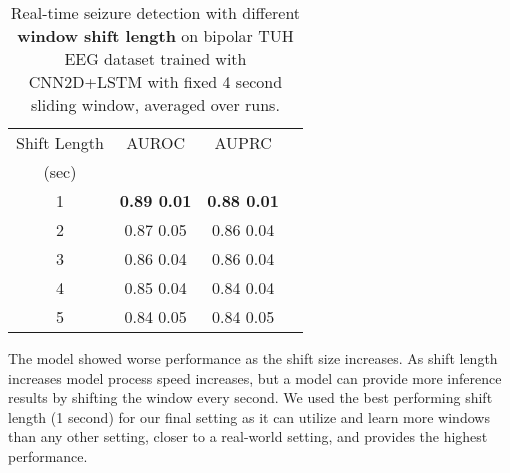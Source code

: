\documentclass[pmlr,twocolumn,10pt]{jmlr}
\begin{document}
%
 \begin{table}[h!]
	\small
	\centering
	\caption{Real-time seizure detection with different \textbf{window shift length} on bipolar TUH EEG dataset trained with CNN2D+LSTM with fixed 4 second sliding window, averaged over  runs.}
	\label{shift}
	\begin{tabular}{c|ccc}\toprule
		Shift Length & AUROC & AUPRC \\
		(sec)\\
		\midrule
		1 & \textbf{0.89  0.01} & \textbf{0.88  0.01}\\
		2 & 0.87  0.05 & 0.86  0.04\\ 
		3 & 0.86  0.04 & 0.86  0.04\\
		4 & 0.85  0.04 & 0.84  0.04\\
		5 & 0.84  0.05 & 0.84  0.05\\
		\bottomrule
	\end{tabular}
\end{table}
 The model showed worse performance as the shift size increases. As shift length increases model process speed increases, but a model can provide more inference results by shifting the window every second. We used the best performing shift length (1 second) for our final setting as it can utilize and learn more windows than any other setting, closer to a real-world setting, and provides the highest performance.
\end{document}
